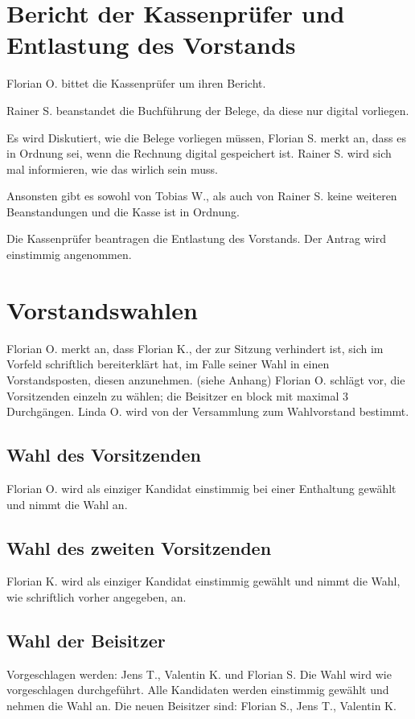 \section{Bericht der Kassenprüfer und Entlastung des Vorstands}
Florian O. bittet die Kassenprüfer um ihren Bericht.

Rainer S. beanstandet die Buchführung der Belege, da diese nur digital vorliegen.

Es wird Diskutiert, wie die Belege vorliegen müssen, Florian S. merkt an, dass es in Ordnung sei, wenn die Rechnung digital gespeichert ist. Rainer S. wird sich mal informieren, wie das wirlich sein muss.

Ansonsten gibt es sowohl von Tobias W., als auch von Rainer S. keine weiteren Beanstandungen und die Kasse ist in Ordnung.

Die Kassenprüfer beantragen die Entlastung  des Vorstands.
Der Antrag wird einstimmig angenommen.

\section{Vorstandswahlen}
 Florian O. merkt an, dass Florian K., der zur Sitzung verhindert ist, sich im Vorfeld schriftlich bereiterklärt hat, im Falle seiner Wahl in einen Vorstandsposten, diesen anzunehmen. (siehe Anhang)
 Florian O. schlägt vor, die Vorsitzenden einzeln zu wählen; die Beisitzer en block mit maximal 3 Durchgängen.
 Linda O. wird von der Versammlung zum Wahlvorstand bestimmt.
\subsection{Wahl des Vorsitzenden}
 Florian O. wird als einziger Kandidat einstimmig bei einer Enthaltung gewählt und nimmt die Wahl an. 
\subsection{Wahl des zweiten Vorsitzenden}         
 Florian K. wird als einziger Kandidat einstimmig gewählt und nimmt die Wahl, wie schriftlich vorher angegeben, an. 
\subsection{Wahl der Beisitzer}
  Vorgeschlagen werden: Jens T., Valentin K. und Florian S.
  Die Wahl wird wie vorgeschlagen durchgeführt. 
  Alle Kandidaten werden einstimmig gewählt und nehmen die Wahl an. 
  Die neuen Beisitzer sind: Florian S., Jens T., Valentin K.

